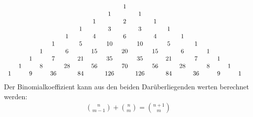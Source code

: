 \documentclass[a4paper]{scrartcl}
\begin{document}
\begin{align}
\begin{tabular}{c c c c c c c c c c c c c c c c c c c c c }
& & & & & & & & & 1& \\
& & & & & & & & 1& & 1& \\
& & & & & & & 1& & 2& & 1& \\
& & & & & & 1& & 3& & 3& &1 \\
& & & & & 1& & 4& &6 & & 4& & 1& \\
& & & & 1& & 5& & 10& & 10&  & 5& & 1& \\
& & & 1& & 6& & 15& & 20& & 15& & 6&& 1& \\
& & 1& & 7& & 21& &35& & 35&& 21 & & 7&& 1& \\
& 1& & 8& & 28& & 56&& 70& & 56& & 28& & 8&& 1& \\
1& & 9& & 36& & 84& & 126& & 126& & 84& & 36& & 9&& 1& \\
\end{tabular}
\end{align}
Der Binomialkoeffizient kann aus den beiden Darüberliegenden werten berechnet werden: 
\begin{align}
\binom{n}{m-1}+\binom{n}{m} = \binom{n+1}{m}
\end{align}
\newpage
\end{document}
